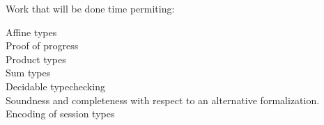 \documentclass[a4paper,UKenglish,cleveref, autoref, thm-restate,authorcolumns]{lipics-v2019}
\begin{document}
Work that will be done time permiting:

\begin{description}

\item [Affine types]
  
\item [Proof of progress]

\item [Product types]

\item [Sum types]

\item [Decidable typechecking]

\item [Soundness and completeness with respect to an alternative formalization.]

\item [Encoding of session types]

\end{description}



\end{document}
